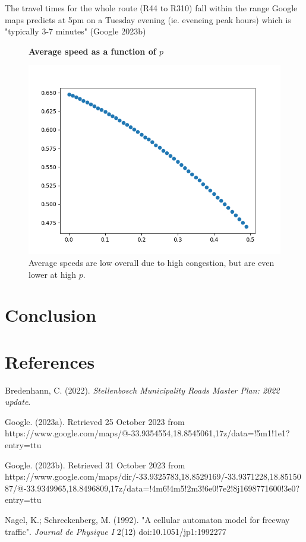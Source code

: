 \documentclass{article}
\begin{document}
The travel times for the whole route (R44 to R310) fall within the range Google maps predicts at 5pm on a Tuesday evening (ie. eveneing peak hours) which is "typically 3-7 minutes" (Google 2023b)

\begin{figure}
\textbf{\large Average speed as a function of $p$}\par\medskip
{}
\includegraphics[scale = 0.55, left]{./data/phase2/v_vs_p.png}
\vspace*{0.1cm}\hspace*{4.5cm}{\large $p$}
\caption{\label{fig} Average speeds are low overall due to high congestion, but are even lower at high $p$.}
\end{figure}

\section*{Conclusion}

\section*{References}


Bredenhann, C. (2022). \textit{Stellenbosch Municipality Roads Master Plan: 2022 update}.

Google. (2023a). Retrieved 25 October 2023 from https://www.google.com/maps/@-33.9354554,18.8545061,17z/data=!5m1!1e1?entry=ttu

Google. (2023b). Retrieved 31 October 2023 from https://www.google.com/maps/dir/-33.9325783,18.8529169/-33.9371228,18.8515087/@-33.9349965,18.8496809,17z/data=!4m6!4m5!2m3!6e0!7e2!8j1698771600!3e0?entry=ttu

Nagel, K.; Schreckenberg, M. (1992). "A cellular automaton model for freeway traffic". \textit{Journal de Physique I} 2(12) doi:10.1051/jp1:1992277
\end{document}
